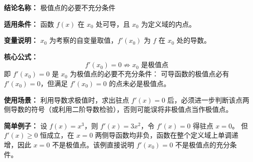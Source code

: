 \textbf{结论名称：} 极值点的必要不充分条件

\textbf{适用条件：} 函数 \( f(x) \) 在 \( x_0 \) 处可导，且 \( x_0 \) 为定义域的内点。

\textbf{变量说明：} \( x_0 \) 为考察的自变量取值，\( f'(x_0) \) 为 \( f \) 在 \( x_0 \) 处的导数。

\textbf{核心公式：} 
\[
\boxed{f'(x_0)=0 \nRightarrow x_0 \text{ 是极值点}} 
\]
即 \( f'(x_0)=0 \) 是 \( x_0 \) 为极值点的必要不充分条件：  
可导函数的极值点必有 \( f'(x_0)=0 \)，但满足 \( f'(x_0)=0 \) 的点未必是极值点。

\textbf{使用场景：} 利用导数求极值时，求出驻点 \( f'(x)=0 \) 后，必须进一步判断该点两侧导数的符号（或利用二阶导数检验），否则可能误将非极值点当作极值点。

\textbf{简单例子：} 
设 \( f(x)=x^{3} \)，则 \( f'(x)=3x^{2} \)，令 \( f'(x)=0 \) 得驻点 \( x=0 \)。  
但 \( f'(x)\ge0 \) 恒成立，在 \( x=0 \) 两侧导函数均非负，函数在整个定义域上单调递增，因此 \( x=0 \) 不是极值点。该例直接说明 \( f'(x_0)=0 \) 不是极值点的充分条件。